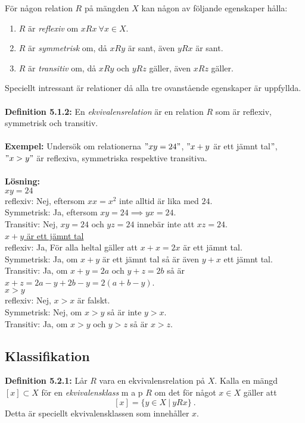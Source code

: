 \documentclass{article}
\begin{document}
För någon relation $R$ på mängden $X$ kan någon av följande egenskaper hålla:
\begin{enumerate}%
    \item $R$ är \textit{reflexiv} om $xRx \ \forall x\in X.$ 
    \item $R$ är \textit{symmetrisk} om, då $xRy$ är sant, även $yRx$ är sant.
    \item $R$ är \textit{transitiv} om, då $xRy$ och $yRz$ gäller, även $xRz$ gäller.
\end{enumerate}
Speciellt intressant är relationer då alla tre ovanstående egenskaper är uppfyllda.\\ \\
\textbf{Definition 5.1.2:} En \textit{ekvivalensrelation} är en relation $R$ som är reflexiv, symmetrisk och transitiv.\\ \\
\textbf{Exempel:} Undersök om relationerna $"xy=24"$, $"x+y$ är ett jämnt tal$"$, $"x>y"$ är reflexiva, symmetriska respektive transitiva.\\ \\
\textbf{Lösning:}\\
\underline{$xy=24$}\\
reflexiv: Nej, eftersom $xx=x^2$ inte alltid är lika med $24$.\\
Symmetrisk: Ja, eftersom $xy=24\implies yx=24$.\\
Transitiv: Nej, $xy=24$ och $yz=24$ innebär inte att $xz=24$.\\
\underline{$x+y$ är ett jämnt tal}\\
reflexiv: Ja, För alla heltal gäller att $x+x=2x$ är ett jämnt tal.\\
Symmetrisk: Ja, om $x+y$ är ett jämnt tal så är även $y+x$ ett jämnt tal.\\
Transitiv: Ja, om $x+y=2a$ och $y+z=2b$ så är $x+z=2a-y+2b-y=2(a+b-y)$.\\
\underline{$x>y$}\\
reflexiv: Nej, $x>x$ är falskt.\\
Symmetrisk: Nej, om $x>y$ så är inte $y>x$.\\
Transitiv: Ja, om $x>y$ och $y>z$ så är $x>z$.

\subsection{Klassifikation}
\textbf{Definition 5.2.1:} Lår $R$ vara en ekvivalensrelation på $X$. Kalla en mängd $[x]\subset X$ för en \textit{ekvivalensklass} m a p $R$ om det för något $x\in X$ gäller att
$$
[x]=\{y\in X \ | \ yRx\} \ .
$$
Detta är speciellt ekvivalensklassen som innehåller $x$.\\
\end{document}
